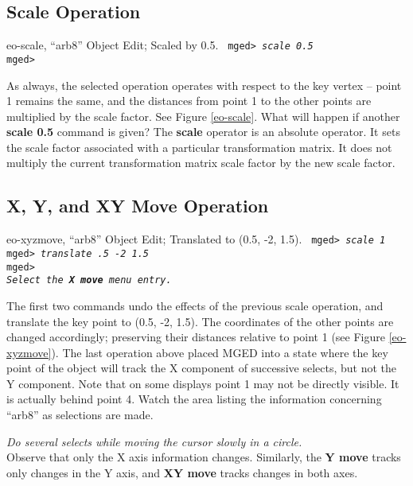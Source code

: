 \subsection{Scale Operation}

\mfig eo-scale, ``arb8'' Object Edit; Scaled by 0.5.
\noindent
{\tt
mged> {\em scale 0.5}\\
mged>\\
}

As always, the selected operation operates with respect to the key
vertex -- point 1 remains the same, and the distances from point 1 to
the other points are multiplied by the scale factor.  See Figure
\ref{eo-scale}.  What will happen if another {\bf scale 0.5} command
is given?  The {\bf scale} operator is an absolute operator.  It sets
the scale factor associated with a particular transformation matrix.
It does not multiply the current transformation matrix scale factor by
the new scale factor.

\subsection{X, Y, and XY Move Operation}

\mfig eo-xyzmove, ``arb8'' Object Edit; Translated to (0.5, -2, 1.5).
\noindent
{\tt
mged> {\em scale 1}\\
mged> {\em translate .5 -2 1.5}\\
mged>\\
{\em Select the {\bf X move} menu entry.}\\
}

The first two commands undo the effects of the previous scale operation, and
translate the key point to (0.5, -2, 1.5).  The coordinates of the other
points are changed accordingly; preserving their distances relative
to point 1 (see Figure \ref{eo-xyzmove}).
The last operation above placed MGED into a state where the key point
of the object will track the X component of successive selects, but not the Y
component. Note that on some displays point 1 may not be directly
visible.  It is actually behind point 4. Watch the area listing the
information concerning ``arb8'' as selections are made.

\noindent
{\em Do several selects while moving the cursor slowly in a circle.}\\

   Observe that only the X axis information changes. Similarly, the {\bf
Y move} tracks only changes in the Y axis, and {\bf XY move} tracks
changes in both axes.

